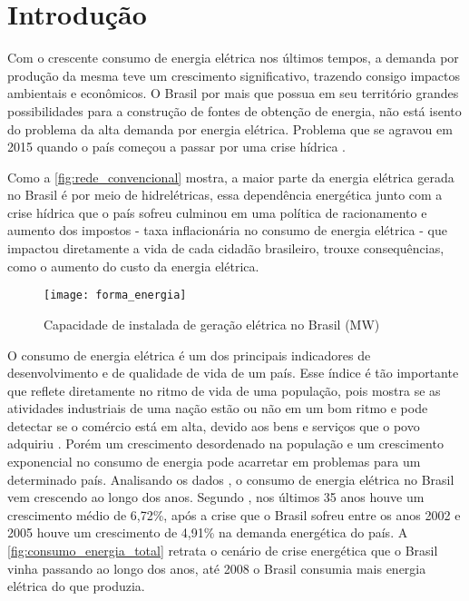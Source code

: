 \chapter[Introdução]{Introdução}
\label{ch:introdução}
Com o crescente consumo de energia elétrica nos últimos tempos, a demanda por produção da mesma teve um crescimento significativo, trazendo consigo 
impactos ambientais e econômicos. O Brasil por mais que possua em seu território grandes possibilidades para a construção de fontes de obtenção de energia, não
está isento do problema da alta demanda por energia elétrica. Problema que se agravou em 2015 quando o país começou a passar por
uma crise hídrica \cite{crise-hidrica-2015}.

Como a \autoref{fig:rede_convencional} mostra, a maior parte da energia elétrica gerada no Brasil é por meio de hidrelétricas, essa dependência
energética junto com a crise hídrica que o país sofreu culminou em uma política de racionamento e aumento dos impostos - taxa inflacionária no
consumo de energia elétrica - que impactou diretamente a vida de cada cidadão brasileiro, trouxe consequências, como o aumento do 
custo da energia elétrica.




\begin{figure}[h!]
	\texttt{[image: forma\_energia]}
	\centering
	\caption[Capacidade de instalada de geração elétrica no Brasil (MW)]{Capacidade de instalada de geração elétrica no Brasil (MW)}
	\label{fig:rede_convencional}
\end{figure}
\FloatBarrier


O consumo de energia elétrica é um dos principais indicadores de desenvolvimento e de qualidade de vida 
de um país. Esse índice é tão importante que reflete diretamente no ritmo de vida de uma população, pois mostra
se as atividades industriais de uma nação estão ou não em um bom ritmo e pode detectar se o comércio está em alta,
devido aos bens e serviços que o povo adquiriu \cite{energia-desenvolvimento}. Porém um crescimento desordenado na população e um crescimento
exponencial no consumo de energia pode acarretar em problemas para um determinado país.
Analisando os dados \cite{epe-balanco-final}, o consumo de energia  
elétrica no Brasil vem crescendo ao longo dos anos. Segundo \cite{ref-jc}, nos últimos 35 anos houve um crescimento médio de 6,72\%, após a crise que o Brasil sofreu entre os anos 2002 e 2005 houve um crescimento
de 4,91\% na demanda energética do país. A \autoref{fig:consumo_energia_total} retrata o cenário de crise energética que o Brasil vinha
passando ao longo dos anos, até 2008 o Brasil consumia mais energia elétrica do que produzia.

